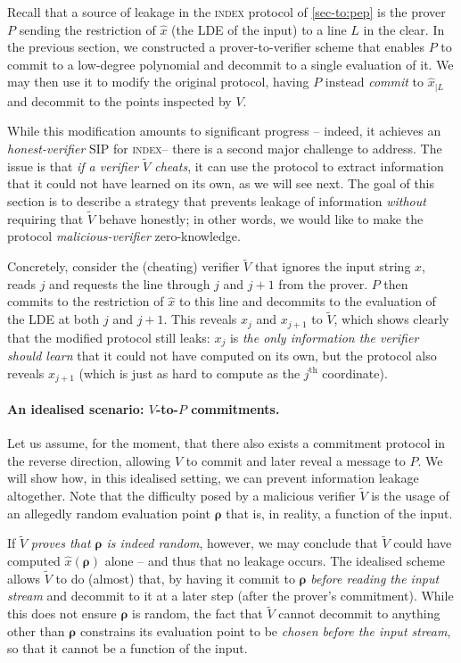 \documentclass[10pt,a4paper]{article}
\newif\iflipics\lipicsfalse
\theoremstyle{definition}
\newcommand{\indexproblem}{\normalfont\textsc{index}\xspace}
\newcommand{\fingerprinttuple}{\bm{\rho}}
\renewcommand{\line}{L}
\begin{document}
   Recall that a source of leakage in the \indexproblem protocol of \cref{sec-to:pep} is the prover $P$ sending the restriction of $\hat x$ (the LDE of the input) to a line $\line$ in the clear. In the previous section, we constructed a prover-to-verifier scheme that enables $P$ to commit to a low-degree polynomial and decommit to a single evaluation of it. We may then use it to modify the original protocol, having $P$ instead \emph{commit} to $\hat x_{|\line}$ and decommit to the points inspected by $V$.
   
   While this modification amounts to significant progress -- indeed, it achieves an \emph{honest-verifier} SIP for \indexproblem  -- there is a second major challenge to address. The issue is that \emph{if a verifier $\widetilde V$ cheats}, it can use the protocol to extract information that it could not have learned on its own, as we will see next. The goal of this section is to describe a strategy that prevents leakage of information \emph{without} requiring that $\widetilde V$ behave honestly; in other words, we would like to make the protocol \emph{malicious-verifier} zero-knowledge.
    
    Concretely, consider the (cheating) verifier $\widetilde V$ that ignores the input string $x$, reads $j$ and requests the line through $j$ and $j + 1$ from the prover. $P$ then commits to the restriction of $\hat x$ to this line and decommits to the evaluation of the LDE at both $j$ and $j + 1$. This reveals $x_j$ and $x_{j+1}$ to $\widetilde V$, which shows clearly that the modified protocol still leaks: $x_j$ is \emph{the only information the verifier should learn} that it could not have computed on its own, but the protocol also reveals $x_{j+1}$ (which is just as hard to compute as the $j^\text{th}$ coordinate).
    
    \paragraph*{An idealised scenario: $V$-to-$P$ commitments\iflipics\else.\fi} Let us assume, for the moment, that there also exists a commitment protocol in the reverse direction, allowing $V$ to commit and later reveal a message to $P$. We will show how, in this idealised setting, we can prevent information leakage altogether. Note that the difficulty posed by a malicious verifier $\widetilde V$ is the usage of an allegedly random evaluation point $\fingerprinttuple$ that is, in reality, a function of the input.
    
    If $\widetilde V$ \emph{proves that $\fingerprinttuple$ is indeed random}, however, we may conclude that $\widetilde V$ could have computed $\hat x(\fingerprinttuple)$ alone -- and thus that no leakage occurs. The idealised scheme allows $\widetilde V$ to do (almost) that, by having it commit to $\fingerprinttuple$ \emph{before reading the input stream} and decommit to it at a later step (after the prover's commitment). While this does not ensure $\fingerprinttuple$ is random, the fact that $\widetilde V$ cannot decommit to anything other than $\fingerprinttuple$ constrains its evaluation point to be \emph{chosen before the input stream}, so that it cannot be a function of the input.
    
\end{document}
